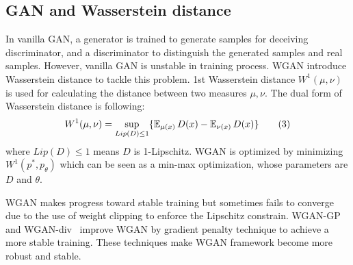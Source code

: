 \subsection{GAN and Wasserstein distance}

In vanilla GAN, a generator is trained to generate samples for deceiving discriminator, and a discriminator to distinguish the generated samples and real samples. However, vanilla GAN is unstable in training process. WGAN introduce Wasserstein distance to tackle this problem. 1st Wasserstein distance $W^1(\mu, \nu)$ is used for calculating the distance between two measures $\mu, \nu$. The dual form of Wasserstein distance is following:
\begin{align*} \label{eq:Wasserstein-distance}
W^1(\mu, \nu) = \sup_{Lip(D) \leq 1} \{\operatorname{\mathbb{E}}_{\mu(x)} D(x)  - \operatorname{\mathbb{E}}_{\nu(x)} D(x)\} \tag{3}
\end{align*}
where $Lip(D) \leq 1$ means $D$ is 1-Lipschitz. WGAN is optimized by minimizing $W^1(p^*, p_\theta)$ which can be seen as a min-max optimization, whose parameters are $D$ and $\theta$. 

WGAN makes progress toward stable training but sometimes fails to converge due to the use of weight clipping to enforce the Lipschitz constrain. WGAN-GP~\cite{gulrajani2017improved} and WGAN-div~\cite{wu2018wasserstein} improve WGAN by gradient penalty technique to achieve a more stable training. These techniques make WGAN framework become more robust and stable. 
